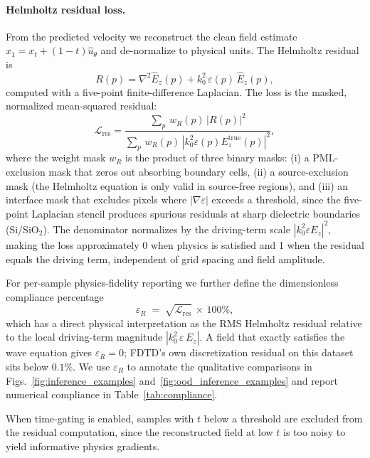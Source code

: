 \documentclass[%
 reprint,
 amsmath,amssymb,
 aps,
floatfix,
]{revtex4-2}
\begin{document}
\paragraph{Helmholtz residual loss.}
From the predicted velocity we reconstruct the clean field estimate
$\hat{x}_1 = x_t + (1-t)\hat{u}_\theta$ and de-normalize to physical units. The Helmholtz residual is
\begin{equation}
    R(p) = \nabla^2 \hat{E}_z(p) + k_0^2\,\varepsilon(p)\,\hat{E}_z(p),
    \label{eq:residual}
\end{equation}
computed with a five-point finite-difference Laplacian. The loss is the masked, normalized mean-squared residual:
\begin{equation}
    \mathcal{L}_\text{res} = \frac{\sum_p\, w_R(p)\,|R(p)|^2}{\sum_p\, w_R(p)\,|k_0^2\varepsilon(p) E_z^\text{true}(p)|^2},
    \label{eq:residual_loss}
\end{equation}
where the weight mask $w_R$ is the product of three binary masks: (i) a PML-exclusion mask that zeros out absorbing boundary cells, (ii) a source-exclusion mask (the Helmholtz equation is only valid in source-free regions), and (iii) an interface mask that excludes pixels where $|\nabla\varepsilon|$ exceeds a threshold, since the five-point Laplacian stencil produces spurious residuals at sharp dielectric boundaries (Si/SiO$_2$). The denominator normalizes by the driving-term scale $|k_0^2\varepsilon E_z|^2$, making the loss approximately 0 when physics is satisfied and 1 when the residual equals the driving term, independent of grid spacing and field amplitude.

For per-sample physics-fidelity reporting we further define the dimensionless compliance percentage
\begin{equation}
    \varepsilon_R \;=\; \sqrt{\mathcal{L}_\text{res}}\,\times\,100\%,
    \label{eq:compliance}
\end{equation}
which has a direct physical interpretation as the RMS Helmholtz residual relative to the local driving-term magnitude $|k_0^2\,\varepsilon\,E_z|$. A field that exactly satisfies the wave equation gives $\varepsilon_R = 0$; FDTD's own discretization residual on this dataset sits below $0.1\%$. We use $\varepsilon_R$ to annotate the qualitative comparisons in Figs.~\ref{fig:inference_examples} and~\ref{fig:ood_inference_examples} and report numerical compliance in Table~\ref{tab:compliance}.

When time-gating is enabled, samples with $t$ below a threshold are excluded from the residual computation, since the reconstructed field at low $t$ is too noisy to yield informative physics gradients.
\end{document}
